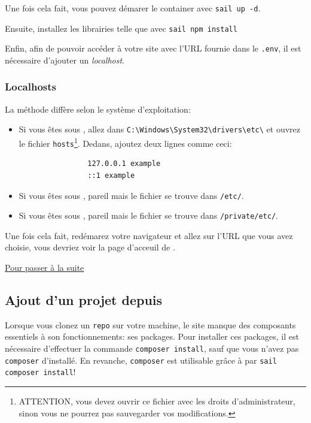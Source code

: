         Une fois cela fait, vous pouvez démarer le container avec \verb|sail up -d|.

        Ensuite, installez les librairies \js{} telle que \vite{} avec \verb|sail npm install|

        Enfin, afin de pouvoir accéder à votre site avec l'URL fournie dans le \verb|.env|, il est nécessaire d'ajouter un \textit{localhost}.

        \newpage
        \subsubsection[Localhosts][fr.wikipedia.org/wiki/Localhost]{Localhosts\label{sec:localhost}}
        La méthode diffère selon le système d'exploitation:
        \begin{itemize}
            \item Si vous êtes sous \windows{}, allez dans \verb|C:\Windows\System32\drivers\etc\| et ouvrez le fichier \verb|hosts|\footnote{ATTENTION, vous devez ouvrir ce fichier avec les droits d'administrateur, sinon vous ne pourrez pas sauvegarder vos modifications.}. Dedans, ajoutez deux lignes comme ceci:
            \begin{lstlisting}
                127.0.0.1 example
                ::1 example
            \end{lstlisting}
            \item Si vous êtes sous \linux{}, pareil mais le fichier se trouve dans \verb|/etc/|.
            \item Si vous êtes sous \macos{}, pareil mais le fichier se trouve dans \verb|/private/etc/|.
        \end{itemize}

        Une fois cela fait, redémarez votre navigateur et allez sur l'URL que vous avez choisie, vous devriez voir la page d'acceuil de \laravel{}.

        \hyperref[sec:suite]{Pour passer à la suite}
    
    \newpage
    \subsection[Ajout d'un projet depuis GitHub]{Ajout d'un projet depuis \github{}\label{sec:project_git}}

    Lorsque vous clonez un \texttt{repo} sur votre machine, le site manque des composants essentiels à son fonctionnements: ses packages. Pour installer ces packages, il est nécessaire d'effectuer la commande \verb|composer install|, sauf que vous n'avez pas \texttt{composer} d'installé. En revanche, \texttt{composer} est utilisable grâce à  \laravelsail{} par \verb|sail composer install|!


